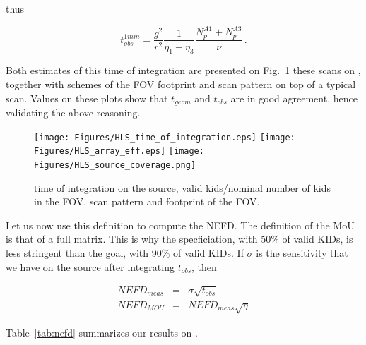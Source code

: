 thus

\begin{equation}
t_{obs}^{1mm} =
\frac{g^2}{r^2}\frac{1}{\eta_1+\eta_3}\frac{N_p^{A1}+N_p^{A3}}{\nu}\,.
\label{eq:t_obs_1mm}
\end{equation}

Both estimates of this time of integration are presented on
Fig.~\ref{fig:time_of_integration} these scans on \hls, together with schemes of
the FOV footprint and scan pattern on top of a typical scan. Values on these
plots show that $t_{geom}$ and $t_{obs}$ are in good agreement, hence validating
the above reasoning.\\

\begin{figure}[htpb]
\begin{center}
\texttt{[image: Figures/HLS\_time\_of\_integration.eps]}
\texttt{[image: Figures/HLS\_array\_eff.eps]}
\texttt{[image: Figures/HLS\_source\_coverage.png]}
\caption{time of integration on the source, valid kids/nominal number of kids in
the FOV, scan pattern and footprint of the FOV.}
\label{fig:time_of_integration}
\end{center}
\end{figure}

Let us now use this definition to compute the NEFD. The definition of the MoU is
that of a full matrix. This is why the specficiation, with 50\% of valid KIDs, is
less stringent than the goal, with 90\% of valid KIDs. If $\sigma$ is the
sensitivity that we have on the source after integrating $t_{obs}$, then

\begin{eqnarray}
NEFD_{meas} &=& \sigma\sqrt{t_{obs}} \label{eq:nefd_meas_def}\\
NEFD_{MOU}  &=& NEFD_{meas}\sqrt{\eta} \label{eq:nefd_full_def}
\end{eqnarray}

Table~\ref{tab:nefd} summarizes our results on \hls.




